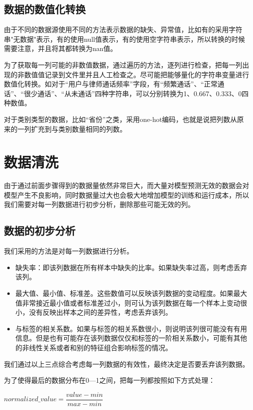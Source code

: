 \subsection{数据的数值化转换}
由于不同的数据源使用不同的方法表示数据的缺失、异常值，比如有的采用字符串"无数据"表示，有的使用null值表示，有的使用空字符串表示，所以转换的时候需要注意，并且将其都转换为nan值。

为了获取每一列可能的非数值数据，通过遍历的方法，逐列进行检查，把每一列出现的非数值值记录到文件里并且人工检查之。尽可能把能够量化的字符串变量进行数值化转换。如对于“用户与律师通话频率”字段，有“频繁通话”、“正常通话”、“很少通话”、“从未通话”四种字符串，可以分别转换为1、0.667、0.333、0四种数值。

对于类别类型的数据，比如“省份”之类，采用one-hot编码，也就是说把列数从原来的一列扩充到与类别数量相同的列数。



\section{数据清洗}
由于通过前面步骤得到的数据量依然非常巨大，而大量对模型预测无效的数据会对模型产生不良影响，同时数据量过大也会极大地增加模型的训练和运行成本，所以我们需要对每一列数据进行初步分析，删除那些可能无效的列。

\subsection{数据的初步分析}
我们采用的方法是对每一列数据进行分析。
\begin{itemize}
	\item 缺失率：即该列数据在所有样本中缺失的比率。如果缺失率过高，则考虑丢弃该列。
	\item 最大值、最小值、标准差。这些数值可以反映该列数据的变动程度。如果最大值非常接近最小值或者标准差过小，则可认为该列数据在每一个样本上变动很小，没有反映出样本之间的差异性，考虑丢弃该列。
	\item 与标签的相关系数。如果与标签的相关系数很小，则说明该列很可能没有有用信息。但是也有可能存在该列数据仅仅和标签的一阶相关系数小，可能有其他的非线性关系或者和别的特征组合影响标签的情况。
\end{itemize}
我们通过以上三点综合考虑每一列数据的有效性，最终决定是否要丢弃该列数据。

为了使得最后的数据分布在0—1之间，把每一列都按照如下方式处理：

$normalized\_value = \dfrac{value - min}{max - min}$